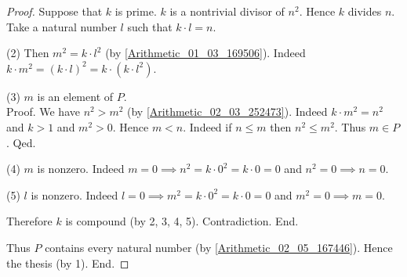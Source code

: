 \documentclass[../../arithmetic.tex]{subfiles}
\begin{document}
\begin{forthel}
\begin{proof}
          Suppose that $k$ is prime.
          $k$ is a nontrivial divisor of $n^{2}$.
          Hence $k$ divides $n$.
          Take a natural number $l$ such that $k \cdot l = n$.

          (2) Then $m^{2} = k \cdot l^{2}$ (by \ref{Arithmetic_01_03_169506}).
          Indeed $k \cdot m^{2} = (k \cdot l)^{2} = k \cdot (k \cdot l^{2})$.

          (3) $m$ is an element of $P$. \\
          Proof.
            We have $n^{2} > m^{2}$ (by \ref{Arithmetic_02_03_252473}).
            Indeed $k \cdot m^{2} = n^{2}$ and $k > 1$ and $m^{2} > 0$.
            Hence $m < n$.
            Indeed if $n \leq m$ then $n^{2} \leq m^{2}$.
            Thus $m \in P$.
          Qed.

          (4) $m$ is nonzero.
          Indeed $m = 0 \implies n^{2} = k \cdot 0^{2} = k \cdot 0 = 0$ and $n^{2} = 0 \implies n = 0$.

          (5) $l$ is nonzero.
          Indeed $l = 0 \implies m^{2} = k \cdot 0^{2} = k \cdot 0 = 0$ and $m^{2} = 0 \implies m = 0$.

          Therefore $k$ is compound (by 2, 3, 4, 5).
          Contradiction.
        End.

        Thus $P$ contains every natural number (by \ref{Arithmetic_02_05_167446}).
        Hence the thesis (by 1).
      End.
    \end{proof}
  \end{forthel}
\end{document}
